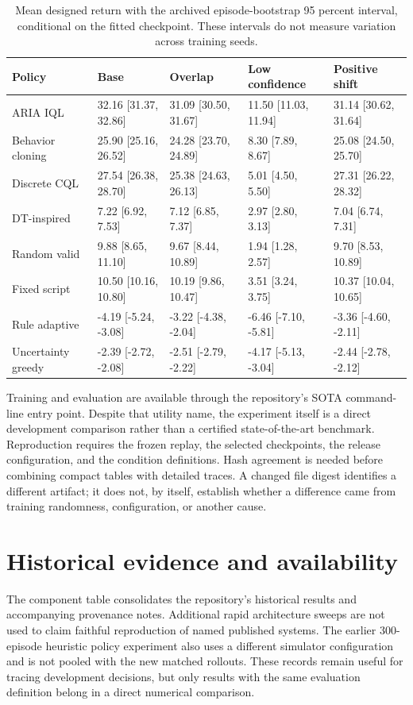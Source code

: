 \documentclass[10pt,a4paper]{article}
\begin{document}
\begin{table}[htbp]
\centering\small
\caption{Mean designed return with the archived episode-bootstrap 95 percent interval, conditional on the fitted checkpoint. These intervals do not measure variation across training seeds.}
\label{tab:uncertainty}
\begin{tabularx}{\linewidth}{XYYYY}
\toprule
Policy & Base & Overlap & Low confidence & Positive shift \\ \midrule
ARIA IQL & 32.16 [31.37, 32.86] & 31.09 [30.50, 31.67] & 11.50 [11.03, 11.94] & 31.14 [30.62, 31.64] \\
Behavior cloning & 25.90 [25.16, 26.52] & 24.28 [23.70, 24.89] & 8.30 [7.89, 8.67] & 25.08 [24.50, 25.70] \\
Discrete CQL & 27.54 [26.38, 28.70] & 25.38 [24.63, 26.13] & 5.01 [4.50, 5.50] & 27.31 [26.22, 28.32] \\
DT-inspired & 7.22 [6.92, 7.53] & 7.12 [6.85, 7.37] & 2.97 [2.80, 3.13] & 7.04 [6.74, 7.31] \\
Random valid & 9.88 [8.65, 11.10] & 9.67 [8.44, 10.89] & 1.94 [1.28, 2.57] & 9.70 [8.53, 10.89] \\
Fixed script & 10.50 [10.16, 10.80] & 10.19 [9.86, 10.47] & 3.51 [3.24, 3.75] & 10.37 [10.04, 10.65] \\
Rule adaptive & -4.19 [-5.24, -3.08] & -3.22 [-4.38, -2.04] & -6.46 [-7.10, -5.81] & -3.36 [-4.60, -2.11] \\
Uncertainty greedy & -2.39 [-2.72, -2.08] & -2.51 [-2.79, -2.22] & -4.17 [-5.13, -3.04] & -2.44 [-2.78, -2.12] \\
\bottomrule
\end{tabularx}
\end{table}

Training and evaluation are available through the repository's SOTA command-line entry point. Despite that utility name, the experiment itself is a direct development comparison rather than a certified state-of-the-art benchmark. Reproduction requires the frozen replay, the selected checkpoints, the release configuration, and the condition definitions. Hash agreement is needed before combining compact tables with detailed traces. A changed file digest identifies a different artifact; it does not, by itself, establish whether a difference came from training randomness, configuration, or another cause.

\section{Historical evidence and availability}
The component table consolidates the repository's historical results and accompanying provenance notes. Additional rapid architecture sweeps are not used to claim faithful reproduction of named published systems. The earlier 300-episode heuristic policy experiment also uses a different simulator configuration and is not pooled with the new matched rollouts. These records remain useful for tracing development decisions, but only results with the same evaluation definition belong in a direct numerical comparison.
\end{document}
